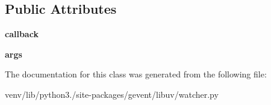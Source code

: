 \subsection*{Public Attributes}
\begin{DoxyCompactItemize}
\item 
\mbox{\label{classgevent_1_1libuv_1_1watcher_1_1___simulated_with_async_mixin_adba409b61b13f55f8093858ba35724d2}} 
{\bfseries callback}
\item 
\mbox{\label{classgevent_1_1libuv_1_1watcher_1_1___simulated_with_async_mixin_a3394ccd194c956a2943a267492f0b683}} 
{\bfseries args}
\end{DoxyCompactItemize}


The documentation for this class was generated from the following file\+:\begin{DoxyCompactItemize}
\item 
venv/lib/python3./site-\/packages/gevent/libuv/watcher.\+py\end{DoxyCompactItemize}
